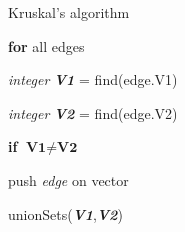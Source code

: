 \documentclass[../Head/Main.tex]{subfiles}
\begin{document}
\begin{Pseudo}{Kruskal's algorithm}{}

 	\textbf{for} all edges  
	\begin{Indentation}
		\item 
	\begin{Indentation}
	\item \textit{integer} \textbf{\textit{V1}} = find(edge.V1)
	\item \textit{integer} \textbf{\textit{V2}} = find(edge.V2)
	\item \textbf{if} $\textbf{V1} \neq \textbf{V2}$   	
	\item push \textit{edge} on vector
	\item unionSets(\textbf{\textit{V1}},\textbf{\textit{V2}})

	\end{Indentation}
	
	\end{Indentation}

\end{Pseudo} 
\end{document}
